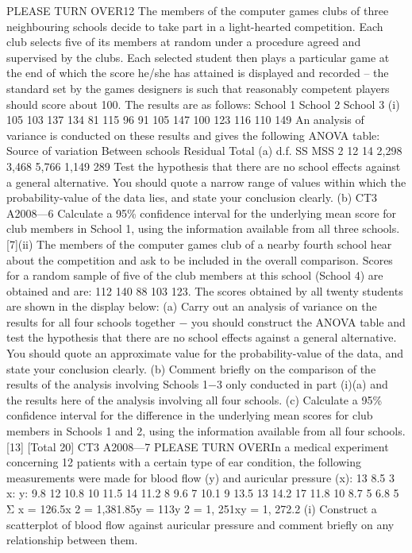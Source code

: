 \documentclass[a4paper,12pt]{article}
\begin{document}
\begin{enumerate}
PLEASE TURN OVER12
The members of the computer games clubs of three neighbouring schools decide to
take part in a light-hearted competition. Each club selects five of its members at
random under a procedure agreed and supervised by the clubs. Each selected student
then plays a particular game at the end of which the score he/she has attained is
displayed and recorded – the standard set by the games designers is such that
reasonably competent players should score about 100.
The results are as follows:
School 1
School 2
School 3
(i)
105
103
137
134
81
115
96
91
105
147
100
123
116
110
149
An analysis of variance is conducted on these results and gives the following
ANOVA table:
Source of variation
Between schools
Residual
Total
(a)
d.f. SS MSS
2
12
14 2,298
3,468
5,766 1,149
289
Test the hypothesis that there are no school effects against a general
alternative.
You should quote a narrow range of values within which the
probability-value of the data lies, and state your conclusion clearly.
(b)
CT3 A2008—6
Calculate a 95\% confidence interval for the underlying mean score for
club members in School 1, using the information available from all
three schools.
[7](ii)
The members of the computer games club of a nearby fourth school hear about
the competition and ask to be included in the overall comparison. Scores for a
random sample of five of the club members at this school (School 4) are
obtained and are:
112 140 88 103 123.
The scores obtained by all twenty students are shown in the display below:
(a)
Carry out an analysis of variance on the results for all four schools
together − you should construct the ANOVA table and test the
hypothesis that there are no school effects against a general alternative.
You should quote an approximate value for the probability-value of the
data, and state your conclusion clearly.
(b) Comment briefly on the comparison of the results of the analysis
involving Schools 1−3 only conducted in part (i)(a) and the results here
of the analysis involving all four schools.
(c) Calculate a 95\% confidence interval for the difference in the
underlying mean scores for club members in Schools 1 and 2, using the
information available from all four schools.
[13]
[Total 20]
CT3 A2008—7
PLEASE TURN OVERIn a medical experiment concerning 12 patients with a certain type of ear condition,
the following measurements were made for blood flow (y) and auricular pressure (x):
13
8.5
3
x:
y:
9.8
12
10.8
10
11.5
14
11.2
8
9.6
7
10.1
9
13.5
13
14.2
17
11.8
10
8.7
5
6.8
5
Σ x = 126.5\sigma x 2 = 1,381.85\sigma y = 113\sigma y 2 = 1, 251\sigma xy = 1, 272.2
(i) Construct a scatterplot of blood flow against auricular pressure and comment
briefly on any relationship between them.


\end{enumerate}
\end{document}
